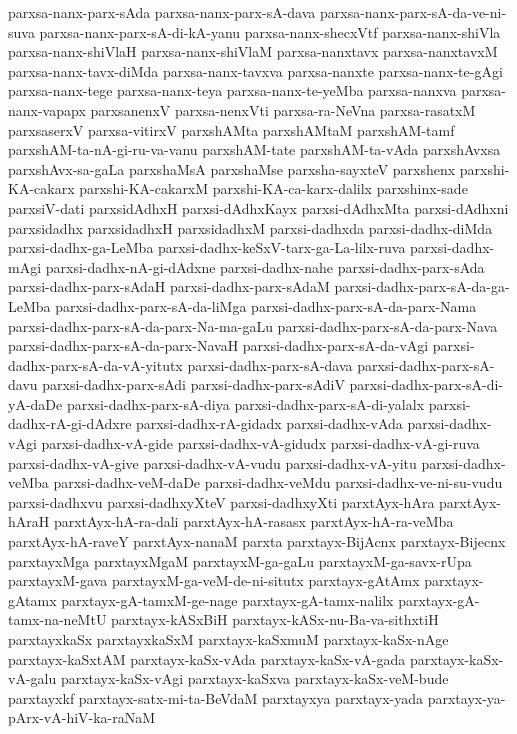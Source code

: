 {parxsa-nanx-parx-sAda
parxsa-nanx-parx-sA-dava
parxsa-nanx-parx-sA-da-ve-ni-suva
parxsa-nanx-parx-sA-di-kA-yanu
parxsa-nanx-shecxVtf
parxsa-nanx-shiVla
parxsa-nanx-shiVlaH
parxsa-nanx-shiVlaM
parxsa-nanxtavx
parxsa-nanxtavxM
parxsa-nanx-tavx-diMda
parxsa-nanx-tavxva
parxsa-nanxte
parxsa-nanx-te-gAgi
parxsa-nanx-tege
parxsa-nanx-teya
parxsa-nanx-te-yeMba
parxsa-nanxva
parxsa-nanx-vapapx
parxsanenxV
parxsa-nenxVti
parxsa-ra-NeVna
parxsa-rasatxM
parxsaserxV
parxsa-vitirxV
parxshAMta
parxshAMtaM
parxshAM-tamf
parxshAM-ta-nA-gi-ru-va-vanu
parxshAM-tate
parxshAM-ta-vAda
parxshAvxsa
parxshAvx-sa-gaLa
parxshaMsA
parxshaMse
parxsha-sayxteV
parxshenx
parxshi-KA-cakarx
parxshi-KA-cakarxM
parxshi-KA-ca-karx-dalilx
parxshinx-sade
parxsiV-dati
parxsidAdhxH
parxsi-dAdhxKayx
parxsi-dAdhxMta
parxsi-dAdhxni
parxsidadhx
parxsidadhxH
parxsidadhxM
parxsi-dadhxda
parxsi-dadhx-diMda
parxsi-dadhx-ga-LeMba
parxsi-dadhx-keSxV-tarx-ga-La-lilx-ruva
parxsi-dadhx-mAgi
parxsi-dadhx-nA-gi-dAdxne
parxsi-dadhx-nahe
parxsi-dadhx-parx-sAda
parxsi-dadhx-parx-sAdaH
parxsi-dadhx-parx-sAdaM
parxsi-dadhx-parx-sA-da-ga-LeMba
parxsi-dadhx-parx-sA-da-liMga
parxsi-dadhx-parx-sA-da-parx-Nama
parxsi-dadhx-parx-sA-da-parx-Na-ma-gaLu
parxsi-dadhx-parx-sA-da-parx-Nava
parxsi-dadhx-parx-sA-da-parx-NavaH
parxsi-dadhx-parx-sA-da-vAgi
parxsi-dadhx-parx-sA-da-vA-yitutx
parxsi-dadhx-parx-sA-dava
parxsi-dadhx-parx-sA-davu
parxsi-dadhx-parx-sAdi
parxsi-dadhx-parx-sAdiV
parxsi-dadhx-parx-sA-di-yA-daDe
parxsi-dadhx-parx-sA-diya
parxsi-dadhx-parx-sA-di-yalalx
parxsi-dadhx-rA-gi-dAdxre
parxsi-dadhx-rA-gidadx
parxsi-dadhx-vAda
parxsi-dadhx-vAgi
parxsi-dadhx-vA-gide
parxsi-dadhx-vA-gidudx
parxsi-dadhx-vA-gi-ruva
parxsi-dadhx-vA-give
parxsi-dadhx-vA-vudu
parxsi-dadhx-vA-yitu
parxsi-dadhx-veMba
parxsi-dadhx-veM-daDe
parxsi-dadhx-veMdu
parxsi-dadhx-ve-ni-su-vudu
parxsi-dadhxvu
parxsi-dadhxyXteV
parxsi-dadhxyXti
parxtAyx-hAra
parxtAyx-hAraH
parxtAyx-hA-ra-dali
parxtAyx-hA-rasasx
parxtAyx-hA-ra-veMba
parxtAyx-hA-raveY
parxtAyx-nanaM
parxta
parxtayx-BijAcnx
parxtayx-Bijecnx
parxtayxMga
parxtayxMgaM
parxtayxM-ga-gaLu
parxtayxM-ga-savx-rUpa
parxtayxM-gava
parxtayxM-ga-veM-de-ni-situtx
parxtayx-gAtAmx
parxtayx-gAtamx
parxtayx-gA-tamxM-ge-nage
parxtayx-gA-tamx-nalilx
parxtayx-gA-tamx-na-neMtU
parxtayx-kASxBiH
parxtayx-kASx-nu-Ba-va-sithxtiH
parxtayxkaSx
parxtayxkaSxM
parxtayx-kaSxmuM
parxtayx-kaSx-nAge
parxtayx-kaSxtAM
parxtayx-kaSx-vAda
parxtayx-kaSx-vA-gada
parxtayx-kaSx-vA-galu
parxtayx-kaSx-vAgi
parxtayx-kaSxva
parxtayx-kaSx-veM-bude
parxtayxkf
parxtayx-satx-mi-ta-BeVdaM
parxtayxya
parxtayx-yada
parxtayx-ya-pArx-vA-hiV-ka-raNaM
}
